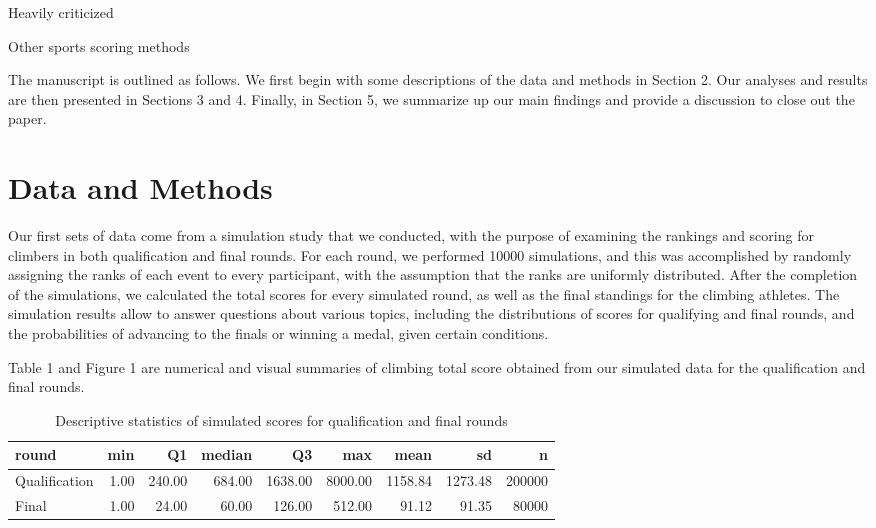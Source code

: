 \documentclass[12pt]{article}
\begin{document}
Heavily criticized

Other sports scoring methods

The manuscript is outlined as follows. We first begin with some
descriptions of the data and methods in Section 2. Our analyses and
results are then presented in Sections 3 and 4. Finally, in Section 5,
we summarize up our main findings and provide a discussion to close out
the paper.

\hypertarget{data-and-methods}{%
\section{Data and Methods}\label{data-and-methods}}

Our first sets of data come from a simulation study that we conducted,
with the purpose of examining the rankings and scoring for climbers in
both qualification and final rounds. For each round, we performed 10000
simulations, and this was accomplished by randomly assigning the ranks
of each event to every participant, with the assumption that the ranks
are uniformly distributed. After the completion of the simulations, we
calculated the total scores for every simulated round, as well as the
final standings for the climbing athletes. The simulation results allow
to answer questions about various topics, including the distributions of
scores for qualifying and final rounds, and the probabilities of
advancing to the finals or winning a medal, given certain conditions.

Table 1 and Figure 1 are numerical and visual summaries of climbing
total score obtained from our simulated data for the qualification and
final rounds.

\begin{table}[ht]
\centering
\caption{Descriptive statistics of simulated scores for qualification and final rounds} 
\begin{tabular}{lrrrrrrrr}
  \hline
round & min & Q1 & median & Q3 & max & mean & sd & n \\ 
  \hline
Qualification & 1.00 & 240.00 & 684.00 & 1638.00 & 8000.00 & 1158.84 & 1273.48 & 200000 \\ 
  Final & 1.00 & 24.00 & 60.00 & 126.00 & 512.00 & 91.12 & 91.35 & 80000 \\ 
   \hline
\end{tabular}
\end{table}
\end{document}
